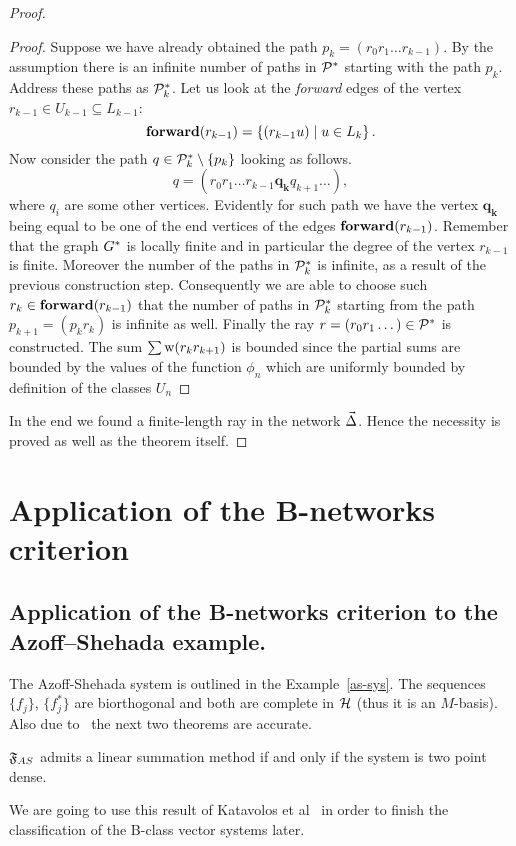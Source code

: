 \documentclass[12pt]{amsart}
\begin{document}
\begin{proof}
\begin{proof}
        Suppose we have already obtained the path $p_k= (r_0 r_1\dots r_{k-1})$.
        By the assumption there is an infinite number of paths in $\cal{P}^*$ starting with the path $p_k$.
        Address these paths as $\cal{P}^*_k$.
        Let us look at the \emph{forward} edges of the vertex $r_{k-1} \in U_{k-1} \subseteq L_{k-1}$:
        \[
          \efor(r_{k-1})=\left\{(r_{k-1} u) \mid u \in L_k\right\}.
        \]
        Now consider the path $q \in \cal{P}^*_k \setminus \left\{p_k\right\}$ looking as follows.
        \[
          q=(r_0 r_1 \dots r_{k-1} \mathbf{q_k} q_{k+1} \dots),
        \]
          where $q_i$ are some other vertices.
        Evidently for such path we have the vertex $\mathbf{q_k}$ being equal to be one of the end vertices of the edges $\efor(r_{k-1})$.
        Remember that the graph $\gstar$ is locally finite and in particular the degree of the vertex $r_{k-1}$ is finite.
        Moreover the number of the paths in $\cal{P}^*_k$ is infinite, as a result of the previous construction step.
        Consequently we are able to choose such $r_k \in \efor(r_{k-1})$ that the number of paths in $\cal{P}^*_k$ starting from
          the path $p_{k+1}= (p_k r_k)$ is infinite as well.
        Finally the ray $r = (r_0 r_1 \dots) \in \cal{P}^*$ is constructed.
        The sum $\sum \wtp(r_k r_{k+1})$ is bounded since the partial sums are bounded by the values of the function $\phi_n$
         which are uniformly bounded by definition of the classes $U_n$
      \end{proof}
      In the end we found a finite-length ray in the network $\onet$.
      Hence the necessity is proved as well as the theorem itself.
    \end{proof}

  \section{Application of the B-networks criterion}
    \subsection{Application of the B-networks criterion to the Azoff--Shehada example.}
      The Azoff-Shehada system is outlined in the Example~\ref{as-sys}.
      The sequences $\{f_j\}$, $\{f^*_j\}$ are biorthogonal and both are complete in $\cal{H}$ (thus it is an $M$-basis).
      Also due to~\cite{katavolos} the next two theorems are accurate.
      \begin{theorem}
        \label{thm-katavolos-1}
          $\fsys_{AS}$ admits a linear summation method if and only if the system is two point dense.
      \end{theorem}
      \begin{note}
        We are going to use this result of Katavolos et al~\cite{katavolos} in order to finish the classification of the B-class vector systems later.
      \end{note}
\end{document}
